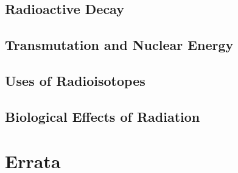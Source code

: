 \documentclass[12pt, openany, letterpaper]{memoir}
\begin{document}
\section{Radioactive Decay}

\section{Transmutation and Nuclear Energy}

\section{Uses of Radioisotopes}

\section{Biological Effects of Radiation}

\backmatter
\chapter{Errata}
\end{document}
